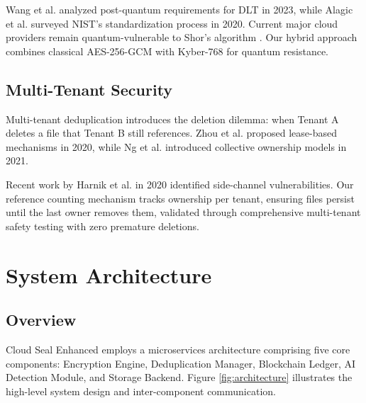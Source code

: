 \documentclass[conference]{IEEEtran}
\begin{document}
Wang et al. \cite{wang2023postquantum} analyzed post-quantum requirements for DLT in 2023, while Alagic et al. \cite{alagic2020status} surveyed NIST's standardization process in 2020. Current major cloud providers remain quantum-vulnerable to Shor's algorithm \cite{shor1997polynomial}. Our hybrid approach combines classical AES-256-GCM with Kyber-768 for quantum resistance.

\subsection{Multi-Tenant Security}
Multi-tenant deduplication introduces the deletion dilemma: when Tenant A deletes a file that Tenant B still references. Zhou et al. \cite{zhou2020secure} proposed lease-based mechanisms in 2020, while Ng et al. \cite{ng2021collective} introduced collective ownership models in 2021.

Recent work by Harnik et al. \cite{harnik2020side} in 2020 identified side-channel vulnerabilities. Our reference counting mechanism tracks ownership per tenant, ensuring files persist until the last owner removes them, validated through comprehensive multi-tenant safety testing with zero premature deletions.

\section{System Architecture}

\subsection{Overview}
Cloud Seal Enhanced employs a microservices architecture comprising five core components: Encryption Engine, Deduplication Manager, Blockchain Ledger, AI Detection Module, and Storage Backend. Figure \ref{fig:architecture} illustrates the high-level system design and inter-component communication.
\end{document}
